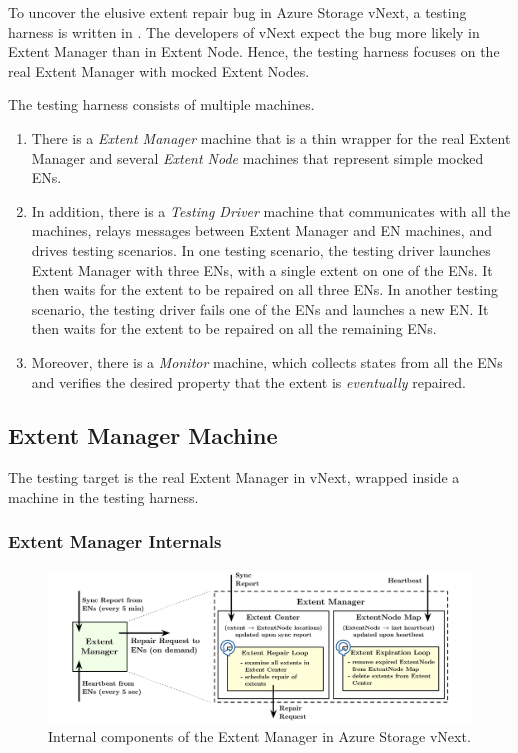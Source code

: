 To uncover the elusive extent repair bug in Azure Storage vNext, a testing harness is written in \psharp. The developers of vNext expect the bug more likely in Extent Manager than in Extent Node. Hence, the testing harness focuses on the real Extent Manager with mocked Extent Nodes.

The testing harness consists of multiple \psharp machines. 
\begin{enumerate}
\item There is a {\em Extent Manager} machine that is a thin wrapper for the real Extent Manager and several {\em Extent Node} machines that represent simple mocked ENs. 

\item In addition, there is a {\em Testing Driver} machine that communicates with all the machines, relays messages between Extent Manager and EN machines, and drives testing scenarios. In one testing scenario, the testing driver launches Extent Manager with three ENs, with a single extent on one of the ENs. It then waits for the extent to be repaired on all three ENs. In another testing scenario, the testing driver fails one of the ENs and launches a new EN. It then waits for the extent to be repaired on all the remaining ENs.

\item Moreover, there is a {\em Monitor} machine, which collects states from all the ENs and verifies the desired property that the extent is {\em eventually} repaired.
\end{enumerate}

\subsection{Extent Manager Machine}
\label{sec:method:wrap_target}

The testing target is the real Extent Manager in vNext, wrapped inside a \psharp machine in the testing harness.

\subsubsection{Extent Manager Internals}

\begin{figure}[t]
\centering
\includegraphics[width=.85\linewidth]{img/extent_manager}
\caption{Internal components of the Extent Manager in Azure Storage vNext.}
\label{fig:extentmanager}
\end{figure}

